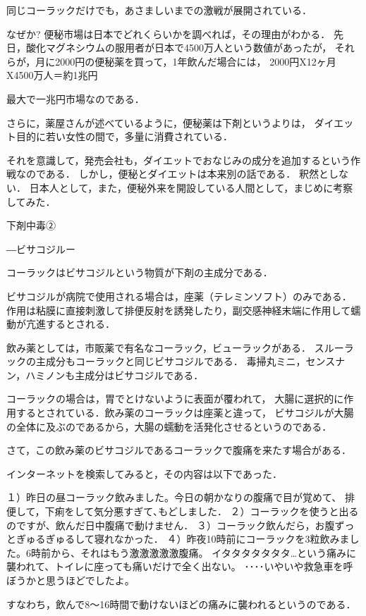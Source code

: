 同じコーラックだけでも，あさましいまでの激戦が展開されている．

なぜか?
便秘市場は日本でどれくらいかを調べれば，その理由がわかる．
先日，酸化マグネシウムの服用者が日本で4500万人という数値があったが，
それらが，月に2000円の便秘薬を買って，1年飲んだ場合には，
2000円X12ヶ月X4500万人＝約1兆円

最大で一兆円市場なのである．

さらに，薬屋さんが述べているように，便秘薬は下剤というよりは，
ダイエット目的に若い女性の間で，多量に消費されている．

それを意識して，発売会社も，ダイエットでおなじみの成分を追加するという作戦なのである．
しかし，便秘とダイエットは本来別の話である．
釈然としない．
日本人として，また，便秘外来を開設している人間として，まじめに考察してみた．

下剤中毒②

―ビサコジルー

コーラックはビサコジルという物質が下剤の主成分である．

ビサコジルが病院で使用される場合は，座薬（テレミンソフト）のみである．
作用は粘膜に直接刺激して排便反射を誘発したり，副交感神経末端に作用して蠕動が亢進するとされる．

飲み薬としては，市販薬で有名なコーラック，ビューラックがある．
スルーラックの主成分もコーラックと同じビサコジルである．
毒掃丸ミニ，センスナン，ハミノンも主成分はビサコジルである．

コーラックの場合は，胃でとけないように表面が覆われて，
大腸に選択的に作用するとされている．飲み薬のコーラックは座薬と違って，
ビサコジルが大腸の全体に及ぶのであるから，大腸の蠕動を活発化させるというのである．

さて，この飲み薬のビサコジルであるコーラックで腹痛を来たす場合がある．

インターネットを検索してみると，その内容は以下であった．


１）昨日の昼コーラック飲みました。今日の朝かなりの腹痛で目が覚めて、
排便して，下痢をして気分悪すぎて､もどしました．
２）コーラックを使うと出るのですが、飲んだ日中腹痛で動けません．
３）コーラック飲んだら，お腹ずっとぎゅるぎゅるして寝れなかった．
４）昨夜10時前にコーラックを3粒飲みました。6時前から、それはもう激激激激激腹痛。
イタタタタタタタ…という痛みに襲われて、トイレに座っても痛いだけで全く出ない。
････いやいや救急車を呼ぼうかと思うほどでしたよ。



すなわち，飲んで8～16時間で動けないほどの痛みに襲われるというのである． 

